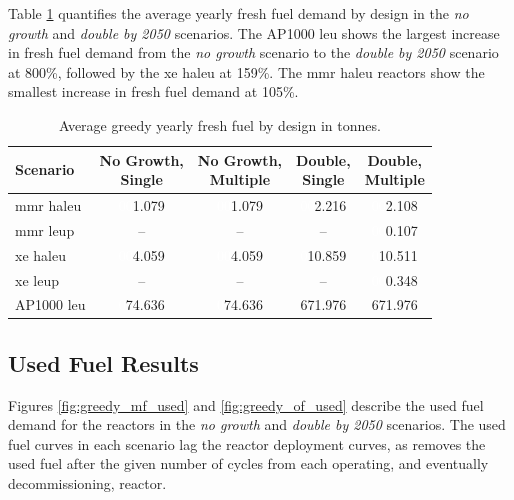 Table \ref{tab:greedy_fresh_avg} quantifies the average yearly fresh fuel demand by design in the \textit{no growth} and \textit{double by 2050} scenarios. The AP1000 \gls{leu} shows the largest increase in fresh fuel demand from the \textit{no growth} scenario to the \textit{double by 2050} scenario at 800\%, followed by the \gls{xe} \gls{haleu} at 159\%. The \gls{mmr} \gls{haleu} reactors show the smallest increase in fresh fuel demand at 105\%.


\begin{table}[H]
  \centering
  \caption{Average greedy yearly fresh fuel by design in tonnes.}
  \label{tab:greedy_fresh_avg}
  \begin{tabular}{l c c c c}
     \toprule
     Scenario & \shortstack{No Growth,\\ Single} & \shortstack{No Growth,\\ Multiple} & \shortstack{Double,\\ Single} & \shortstack{Double,\\ Multiple}  \\
     \midrule
     \gls{mmr} \gls{haleu}   & \textcolor{white}{00}1.079    & \textcolor{white}{00}1.079   & \textcolor{white}{00}2.216    & \textcolor{white}{00}2.108    \\
     \gls{mmr} \gls{leup}    & --       & --      & --       & \textcolor{white}{00}0.107    \\
     \gls{xe} \gls{haleu}    & \textcolor{white}{00}4.059    & \textcolor{white}{00}4.059   & \textcolor{white}{0}10.859   & \textcolor{white}{0}10.511   \\
     \gls{xe} \gls{leup}     & --       & --      & --       & \textcolor{white}{00}0.348    \\
     AP1000 \gls{leu}        & \textcolor{white}{0}74.636   & \textcolor{white}{0}74.636  & 671.976  & 671.976  \\
     \hline
  \end{tabular}
\end{table}



\subsection{Used Fuel Results}
\label{sec:greedy_used}

Figures \ref{fig:greedy_mf_used} and \ref{fig:greedy_of_used} describe the used fuel demand for the reactors in the \textit{no growth} and \textit{double by 2050} scenarios. The used fuel curves in each scenario lag the reactor deployment curves, as \cyclus removes the used fuel after the given number of cycles from each operating, and eventually decommissioning, reactor.

